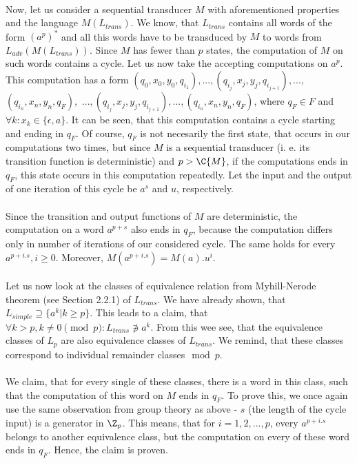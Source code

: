 \paragraph{}
Now, let us consider a sequential transducer $M$ with aforementioned properties and the language $M(L_{trans})$. We know, that $L_{trans}$ contains all words of the form $(a^p)^*$ and all this words have to be transduced by $M$ to words from $L_{adv} (M(L_{trans}))$. Since $M$ has fewer than $p$ states, the computation of $M$ on such words contains a cycle. Let us now take the accepting computations on $a^p$. This computation has a form $(q_0,x_0,y_0,q_{i_1}),...,(q_{i_j},x_j,y_j,q_{i_{j+1}}),...,$ $(q_{i_n},x_n,y_n,q_F),$ $...,(q_{i_{j}},x_{j},y_{j},q_{i_{j+1}}), ..., (q_{i_n},x_n,y_n,q_F)$, where $q_F \in F$ and $\forall k: x_k \in \{\epsilon,a\}$. It can be seen, that this computation contains a cycle starting and ending in $q_F$. Of course, $q_F$ is not necesarily the first state, that occurs in our computations two times, but since $M$ is a sequential transducer (i. e. its transition function is deterministic) and $p > \C{M}$, if the computations ends in $q_F$, this state occurs in this computation repeatedly. Let the input and the output of one iteration of this cycle be $a^s$ and $u$, respectively.

\paragraph{}
Since the transition and output functions of $M$ are deterministic, the computation on a word $a^{p+s}$ also ends in $q_F$, because the computation differs only in number of iterations of our considered cycle. The same holds for every $a^{p+i.s}, i \geq 0$. Moreover, $M(a^{p+i.s}) = M(a).u^i$. 

\paragraph{}
Let us now look at the classes of equivalence relation from Myhill-Nerode theorem (see Section 2.2.1) of $L_{trans}$. We have already shown, that $L_{simple} \supseteq \{a^k| k \geq p\}$. This leads to a claim, that $\forall k > p, k \neq 0 \pmod{p}: L_{trans} \not \ni a^k$. From this wee see, that the equivalence classes of $L_p$ are also equivalence classes of $L_{trans}$. We remind, that these classes correspond to individual remainder classes$\mod p$.

\paragraph{}
We claim, that for every single of these classes, there is a word in this class, such that the computation of this word on $M$ ends in $q_F$. To prove this, we once again use the same observation from group theory as above - $s$ (the length of the cycle input) is a generator in $\Z_p$. This means, that for $i = 1, 2, ..., p$, every $a^{p+i.s}$ belongs to another equivalence class, but the computation on every of these word ends in $q_F$. Hence, the claim is proven.

